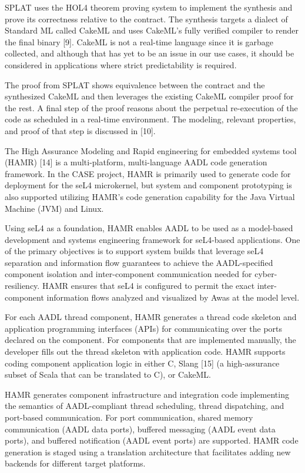 SPLAT uses the HOL4 theorem proving system to implement the synthesis and prove its correctness relative to the contract. The synthesis targets a dialect of Standard ML called CakeML and uses CakeML’s fully verified compiler to render the final binary [9]. CakeML is not a real-time language since it is garbage collected, and although that has yet to be an issue in our use cases, it should be considered in applications where strict predictability is required. 

The proof from SPLAT shows equivalence between the contract and the synthesized CakeML and then leverages the existing CakeML compiler proof for the rest. A final step of the proof reasons about the perpetual re-execution of the code as scheduled in a real-time environment. The modeling, relevant properties, and proof of that step is discussed in [10].

The High Assurance Modeling and Rapid engineering for embedded systems tool (HAMR) [14] is a multi-platform, multi-language AADL code generation framework. In the CASE project, HAMR is primarily used to generate code for deployment for the seL4 microkernel, but system and component prototyping is also supported utilizing HAMR’s code generation capability for the Java Virtual Machine (JVM) and Linux. 

Using seL4 as a foundation, HAMR enables AADL to be used as a model-based development and systems engineering framework for seL4-based applications. One of the primary objectives is to support system builds that leverage seL4 separation and information flow guarantees to achieve the AADL-specified component isolation and inter-component communication needed for cyber-resiliency. HAMR ensures that seL4 is configured to permit the exact inter-component information flows analyzed and visualized by Awas at the model level.

For each AADL thread component, HAMR generates a thread code skeleton and application programming interfaces (APIs) for communicating over the ports declared on the component. For components that are implemented manually, the developer fills out the thread skeleton with application code. HAMR supports coding component application logic in either C, Slang [15] (a high-assurance subset of Scala that can be translated to C), or CakeML. 

HAMR generates component infrastructure and integration code implementing the semantics of AADL-compliant thread scheduling, thread dispatching, and port-based communication. For port communication, shared memory communication (AADL data ports), buffered messaging (AADL event data ports), and buffered notification (AADL event ports) are supported. HAMR code generation is staged using a translation architecture that facilitates adding new backends for different target platforms. 

